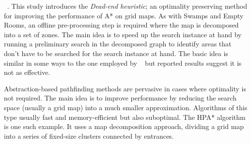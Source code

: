 \citeauthor{bjornsson06}~.  This study introduces the
\emph{Dead-end heuristic}; an optimality preserving
 method for improving the performance of A* on grid maps.
As with Swamps and Empty Rooms, an offline pre-processing step is required where
the map is decomposed into a set of zones.  The main idea is to speed up the
search instance at hand by running a preliminary search in the decomposed graph
to identify areas that don't have to be searched for the search instance at
hand.  The basic idea is similar in some ways to the one employed by
\citeauthor{pochter10}~ but reported results suggest it is
not as effective.
\par
Abstraction-based pathfinding methods are pervasive in cases where optimality is
not required.  The main idea is to improve performance by reducing the 
search space (usually a grid map) into a much smaller approximation.  Algorithms
of this type usually fast and memory-efficient but also suboptimal.  The HPA*
algorithm \cite{botea04} is one such example.  It uses a map decomposition
approach, dividing a grid map into a series of fixed-size clusters connected by
entrances.
